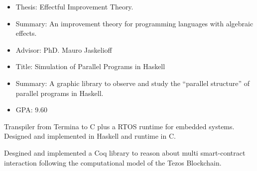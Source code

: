 

\newpage

    \begin{itemize}
        \item Thesis: Effectful Improvement Theory.
        \item Summary: An improvement theory for programming languages with
                algebraic effects.
        \item Advisor: PhD. Mauro Jaskelioff
    \end{itemize}
    \divider

    \begin{itemize}
        \item Title: Simulation of Parallel Programs in Haskell
        \item Summary: A graphic library to observe and study the ``parallel
                structure'' of parallel programs in Haskell.
        \item GPA: 9.60
    \end{itemize}

    Transpiler from Termina to C plus a RTOS runtime for embedded systems.
    Designed and implemented in Haskell and runtime in C.
    \divider

    Desgined and implemented a Coq library to reason about multi smart-contract
interaction following the computational model of the Tezos Blockchain.

